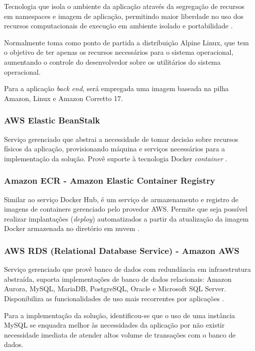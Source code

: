\documentclass[
    12pt,               %
    openright,          %
    oneside,
    a4paper,            %
    BIBLATEX,           %
    TODO,               %
    english,            %
    brazil              %
    ]{ifsp-spo-inf-ctds}
\begin{document}
            Tecnologia que isola o ambiente da aplicação através da segregação de recursos em namespaces e imagem de aplicação, permitindo maior liberdade no uso dos recursos computacionais de execução em ambiente isolado e portabilidade .

            Normalmente toma como ponto de partida a distribuição Alpine Linux, que tem o objetivo de ter apenas os recursos necessários para o sistema operacional, aumentando o controle do desenvolvedor sobre os utilitários do sistema operacional.

            Para a aplicação \emph{back end}, será empregada uma imagem baseada na pilha Amazon, Linux e Amazon Corretto 17.

        \subsubsection{AWS Elastic BeanStalk}

            Serviço gerenciado que abstrai a necessidade de tomar decisão sobre recursos físicos da aplicação, provisionando máquina e serviços necessários para a implementação da solução. Provê suporte à tecnologia Docker \emph{container} .

        \subsubsection{Amazon ECR - Amazon Elastic Container Registry}

            Similar ao serviço Docker Hub, é um serviço de armazenamento e registro de imagens de containers gerenciado pelo provedor AWS. Permite que seja possível realizar implantações (\emph{deploy}) automatizados a partir da atualização da imagem Docker armazenada no diretório em nuvem .

        \subsubsection{AWS RDS (Relational Database Service) - Amazon AWS}

            Serviço gerenciado que provê banco de dados com redundância em infraestrutura abstraída, suporta implementações de banco de dados relacionais: Amazon Aurora, MySQL, MariaDB, PostgreSQL, Oracle e Microsoft SQL Server. Disponibiliza as funcionalidades de uso mais recorrentes por aplicações .

            Para a implementação da solução, identificou-se que o uso de uma instância MySQL se enquadra melhor às necessidades da aplicação por não existir necessidade imediata de atender altos volume de transações com o banco de dados.
\end{document}
